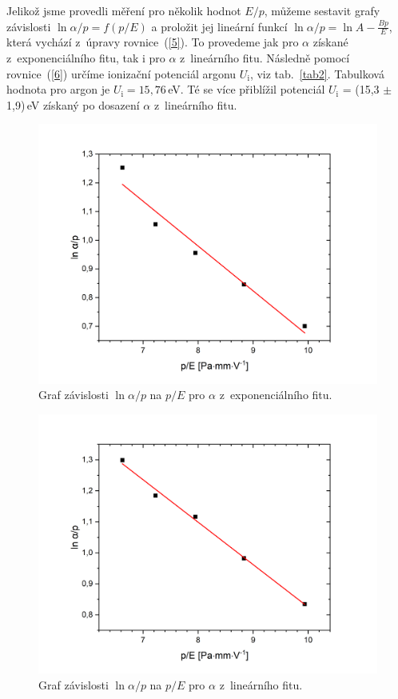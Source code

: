 \documentclass[a4paper,12pt]{article}
\begin{document}
\newpage
Jelikož jsme provedli měření pro několik hodnot $E/p$, můžeme sestavit grafy 
závislosti $\ln \alpha/p = f(p/E)$ a proložit jej lineární funkcí $\ln \alpha/p 
= \ln A - \frac{Bp}{E}$, která vychází z~úpravy rovnice~(\ref{5}). To provedeme 
jak pro $\alpha$ získané z~exponenciálního fitu, tak i pro $\alpha$ z~lineárního fitu. Následně pomocí rovnice~(\ref{6}) určíme ionizační potenciál 
argonu $U_\text{i}$, viz tab.~\ref{tab2}. Tabulková hodnota pro argon je $U_\text{i} = 
15,76$\,eV. Té se více přiblížil potenciál $U_\text{i}$ = (15,3 $\pm$  1,9)\,eV 
získaný po 
dosazení $\alpha$ z~lineárního fitu.
 
 \begin{figure}[h]
 	\centering
 	\includegraphics[width=145mm]{exp.png}
 	\caption{Graf závislosti $\ln \alpha/p$ na $p/E$ pro $\alpha$ 
 	z~exponenciálního fitu.}
 	\label{exp}
 \end{figure}

 \begin{figure}[h]
	\centering
	\includegraphics[width=145mm]{lin.png}
	\caption{Graf závislosti $\ln \alpha/p$ na $p/E$ pro $\alpha$ z~lineárního 
	fitu.}
	\label{lin}
\end{figure}
 
\end{document}
